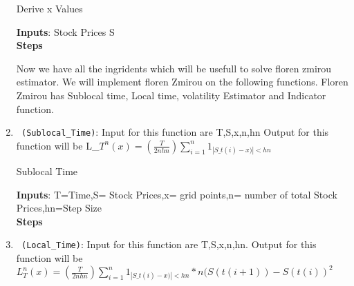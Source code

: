 \begin{enumerate}
  \begin{algorithm}
  \caption{Derive x Values}
  \bigskip
  \textbf{Inputs}: Stock Prices S\\
  \textbf{Steps}
  \end{algorithm}
Now we have all the ingridents which will be usefull to solve floren zmirou estimator.
We will implement floren Zmirou on the following functions. Floren Zmirou has Sublocal time, Local time, volatility Estimator and Indicator function.
  \item \verb! (Sublocal_Time)!: Input for this function are T,S,x,n,hn
 Output for this function will be L_${T}^n(x) = (\frac{T}{2nhn}) \sum_{i =1}^ n 1_{|S\_t(i)-x)| < hn}$
  \begin{algorithm}
  \caption{Sublocal Time}
  \bigskip
  \textbf{Inputs}: T=Time,S= Stock Prices,x= grid points,n= number of total Stock Prices,hn=Step Size\\
  \textbf{Steps}
  \end{algorithm}
  \item \verb! (Local_Time)!: Input for this function are T,S,x,n,hn.
 Output for this function will be $L_{T}^n(x) = (\frac{T}{2nhn}) \sum_{i =1}^ n 1_{|S\_t(i)-x)| < hn}*n(S(t(i+1))-S(t(i))^2$

\end{enumerate}
